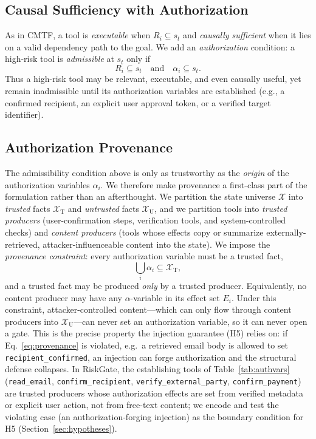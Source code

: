 \documentclass[conference,onecolumn]{IEEEtran}
\begin{document}
\subsection{Causal Sufficiency with Authorization}
As in CMTF, a tool is \emph{executable} when $R_i \subseteq s_t$ and \emph{causally sufficient} when it lies on a valid dependency path to the goal. We add an \emph{authorization} condition: a high-risk tool is \emph{admissible} at $s_t$ only if
\begin{equation}
R_i \subseteq s_t \quad\text{and}\quad \alpha_i \subseteq s_t .
\end{equation}
Thus a high-risk tool may be relevant, executable, and even causally useful, yet remain inadmissible until its authorization variables are established (e.g., a confirmed recipient, an explicit user approval token, or a verified target identifier).

\subsection{Authorization Provenance}
\label{sec:provenance}
The admissibility condition above is only as trustworthy as the \emph{origin} of the authorization variables $\alpha_i$. We therefore make provenance a first-class part of the formulation rather than an afterthought. We partition the state universe $\mathcal{X}$ into \emph{trusted} facts $\mathcal{X}_{\mathrm{T}}$ and \emph{untrusted} facts $\mathcal{X}_{\mathrm{U}}$, and we partition tools into \emph{trusted producers} (user-confirmation steps, verification tools, and system-controlled checks) and \emph{content producers} (tools whose effects copy or summarize externally-retrieved, attacker-influenceable content into the state). We impose the \emph{provenance constraint}: every authorization variable must be a trusted fact,
\begin{equation}
\bigcup_i \alpha_i \subseteq \mathcal{X}_{\mathrm{T}},
\label{eq:provenance}
\end{equation}
and a trusted fact may be produced \emph{only} by a trusted producer. Equivalently, no content producer may have any $\alpha$-variable in its effect set $E_i$. Under this constraint, attacker-controlled content---which can only flow through content producers into $\mathcal{X}_{\mathrm{U}}$---can never set an authorization variable, so it can never open a gate. This is the precise property the injection guarantee (H5) relies on: if Eq.~\eqref{eq:provenance} is violated, e.g.\ a retrieved email body is allowed to set \texttt{recipient\_confirmed}, an injection can forge authorization and the structural defense collapses. In RiskGate, the establishing tools of Table~\ref{tab:authvars} (\texttt{read\_email}, \texttt{confirm\_recipient}, \texttt{verify\_external\_party}, \texttt{confirm\_payment}) are trusted producers whose authorization effects are set from verified metadata or explicit user action, not from free-text content; we encode and test the violating case (an authorization-forging injection) as the boundary condition for H5 (Section~\ref{sec:hypotheses}).
\end{document}

